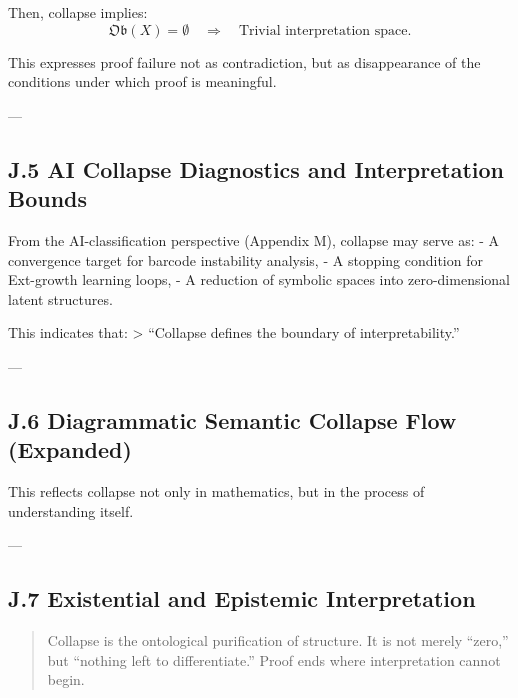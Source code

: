 \documentclass[11pt]{article}
\begin{document}
\begin{axiom}
\begin{axiom}
Then, collapse implies:
\[
\mathfrak{Ob}(X) = \emptyset \quad \Rightarrow \quad \text{Trivial interpretation space}.
\]

This expresses proof failure not as contradiction, but as disappearance of the conditions under which proof is meaningful.

---

\subsection*{J.5 AI Collapse Diagnostics and Interpretation Bounds}

From the AI-classification perspective (Appendix M), collapse may serve as:
- A convergence target for barcode instability analysis,
- A stopping condition for Ext-growth learning loops,
- A reduction of symbolic spaces into zero-dimensional latent structures.

This indicates that:
> “Collapse defines the boundary of interpretability.”

---

\subsection*{J.6 Diagrammatic Semantic Collapse Flow (Expanded)}

\begin{center}
\end{center}

This reflects collapse not only in mathematics, but in the process of understanding itself.

---

\subsection*{J.7 Existential and Epistemic Interpretation}

\begin{quote}
Collapse is the ontological purification of structure.  
It is not merely “zero,” but “nothing left to differentiate.”  
Proof ends where interpretation cannot begin.
\end{quote}


\end{axiom}
\end{axiom}
\end{document}
